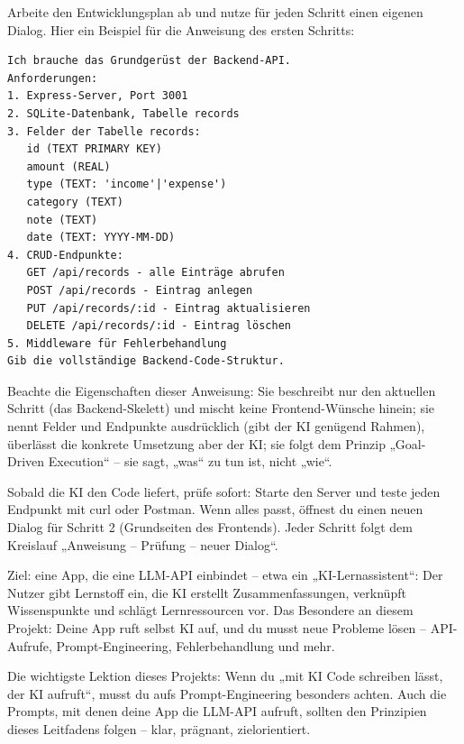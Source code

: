 
Arbeite den Entwicklungsplan ab und nutze für jeden Schritt einen eigenen Dialog. Hier ein Beispiel für die Anweisung des ersten Schritts:

\begin{lstlisting}
Ich brauche das Grundgerüst der Backend-API.
Anforderungen:
1. Express-Server, Port 3001
2. SQLite-Datenbank, Tabelle records
3. Felder der Tabelle records:
   id (TEXT PRIMARY KEY)
   amount (REAL)
   type (TEXT: 'income'|'expense')
   category (TEXT)
   note (TEXT)
   date (TEXT: YYYY-MM-DD)
4. CRUD-Endpunkte:
   GET /api/records - alle Einträge abrufen
   POST /api/records - Eintrag anlegen
   PUT /api/records/:id - Eintrag aktualisieren
   DELETE /api/records/:id - Eintrag löschen
5. Middleware für Fehlerbehandlung
Gib die vollständige Backend-Code-Struktur.
\end{lstlisting}

Beachte die Eigenschaften dieser Anweisung: Sie beschreibt nur den aktuellen Schritt (das Backend-Skelett) und mischt keine Frontend-Wünsche hinein; sie nennt Felder und Endpunkte ausdrücklich (gibt der KI genügend Rahmen), überlässt die konkrete Umsetzung aber der KI; sie folgt dem Prinzip „Goal-Driven Execution“ – sie sagt, „was“ zu tun ist, nicht „wie“.

Sobald die KI den Code liefert, prüfe sofort: Starte den Server und teste jeden Endpunkt mit curl oder Postman. Wenn alles passt, öffnest du einen neuen Dialog für Schritt 2 (Grundseiten des Frontends). Jeder Schritt folgt dem Kreislauf „Anweisung – Prüfung – neuer Dialog“.



Ziel: eine App, die eine LLM-API einbindet – etwa ein „KI-Lernassistent“: Der Nutzer gibt Lernstoff ein, die KI erstellt Zusammenfassungen, verknüpft Wissenspunkte und schlägt Lernressourcen vor. Das Besondere an diesem Projekt: Deine App ruft selbst KI auf, und du musst neue Probleme lösen – API-Aufrufe, Prompt-Engineering, Fehlerbehandlung und mehr.

Die wichtigste Lektion dieses Projekts: Wenn du „mit KI Code schreiben lässt, der KI aufruft“, musst du aufs Prompt-Engineering besonders achten. Auch die Prompts, mit denen deine App die LLM-API aufruft, sollten den Prinzipien dieses Leitfadens folgen – klar, prägnant, zielorientiert.


